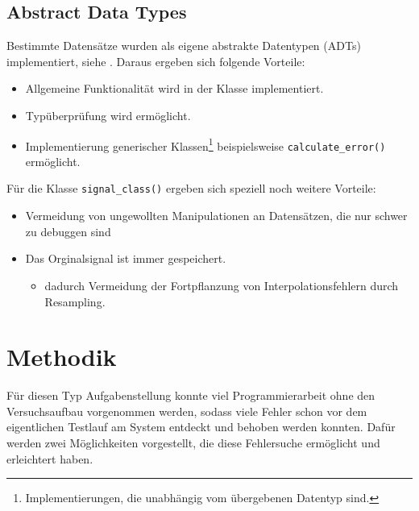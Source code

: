 \documentclass[../Report.tex]{subfiles}
\begin{document}
\subsection*{Abstract Data Types}
\label{subsec:code.adt}
Bestimmte Datensätze wurden als eigene abstrakte Datentypen (ADTs) implementiert, siehe \cite[Kap. 6.1]{mcConnell}. Daraus ergeben sich folgende Vorteile:
\begin{itemize}
	\item Allgemeine Funktionalität wird in der Klasse implementiert.
	\item Typüberprüfung wird ermöglicht.
	\item Implementierung generischer Klassen\footnote{Implementierungen, die unabhängig vom übergebenen Datentyp sind.} beispielsweise \lstinline{calculate_error()} ermöglicht.
\end{itemize}
Für die Klasse \lstinline{signal_class()} ergeben sich speziell noch weitere Vorteile:
\begin{itemize}
\item Vermeidung von ungewollten Manipulationen an Datensätzen, die nur schwer zu debuggen sind
	\item Das Orginalsignal ist immer gespeichert.
	\begin{itemize}
		\item dadurch Vermeidung der Fortpflanzung von Interpolationsfehlern durch Resampling.
	\end{itemize}
\end{itemize}

\section{Methodik}
\label{subsec:code.methodik}
Für diesen Typ Aufgabenstellung konnte viel Programmierarbeit ohne den Versuchsaufbau vorgenommen werden, sodass viele Fehler schon vor dem eigentlichen Testlauf am System entdeckt und behoben werden konnten. Dafür werden zwei Möglichkeiten vorgestellt, die diese Fehlersuche ermöglicht und erleichtert haben.
\end{document}
